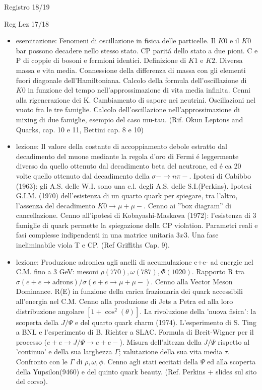 \begin{frame}{Registro 18/19}
\begin{frame}[allowframebreaks]{Reg Lez 17/18}
\begin{itemize}
\item esercitazione: Fenomeni di oscillazione in fisica delle particelle. Il $K0$ e il $K0$bar possono decadere nello stesso stato. CP parit\'a dello stato a due pioni. C e P di coppie di bosoni e fermioni identici. Definizione di $K1$ e $K2$. Diversa massa e vita media. Connessione della differenza di massa con gli elementi fuori diagonale dell'Hamiltoniana. Calcolo della formula dell'oscillazione di $K0$ in funzione del tempo nell'approssimazione di vita media infinita. Cenni alla rigenerazione dei K. Cambiamento di sapore nei neutrini. Oscillazioni nel vuoto fra le tre famiglie. Calcolo dell'oscillazione nell'approssimazione di mixing di due famiglie, esempio del caso mu-tau. (Rif. Okun Leptons and Quarks, cap. 10 e 11, Bettini cap. 8 e 10)

\item lezione: Il valore della costante di accoppiamento debole estratto dal decadimento del muone mediante la regola d'oro di Fermi \'e leggermente diverso da quello ottenuto dal decadimento beta del neutrone, ed \'e ca 20 volte quello ottenuto dal decadimento della $\sigma-\to n\pi-$. Ipotesi di Cabibbo (1963): gli A.S. delle W.I. sono una c.l. degli A.S. delle S.I.(Perkins). Ipotesi G.I.M. (1970) dell'esistenza di un quarto quark per spiegare, tra l'altro, l'assenza del decadimento $K0\to\mu+\mu-$. Cenno ai ''box diagram'' di cancellazione. Cenno all'ipotesi di Kobayashi-Maskawa (1972): l'esistenza di 3 famiglie di quark permette la spiegazione della CP violation. Parametri reali e fasi complesse indipendenti in una matrice unitaria $3x3$. Una fase ineliminabile viola T e CP. (Ref Griffiths Cap. 9).

\item  lezione: Produzione adronica agli anelli di accumulazione e+e- ad energie nel C.M. fino a 3 GeV: mesoni $\rho(770),\omega(787),\Phi(1020)$. Rapporto R tra $\sigma(e+e\to\text{adrons})/\sigma(e+e\to\mu+\mu-)$. Cenno alla Vector Meson Dominance. R(E) in funzione della carica frazionaria dei quark accessibili all'energia nel C.M. Cenno alla produzione di Jets a Petra ed alla loro distribuzione angolare $[1+\cos^2(\theta)]$. La rivoluzione della 'nuova fisica': la scoperta della $J/\Psi$ e del quarto quark charm (1974). L'esperimento di S. Ting a BNL e l'esperimento di B. Richter a SLAC. Formula di Breit-Wigner per il processo ($e+e\to J/\Psi\to e+e-$). Misura dell'altezza della $J/\Psi$ rispetto al 'continuo' e della sua larghezza $\Gamma$; valutazione della sua vita media $\tau$. Confronto con le $\Gamma$ di $\rho,\omega,\phi$. Cenno agli stati eccitati della $\Psi$ ed alla scoperta della Yupsilon(9460) e del quinto quark beauty. (Ref. Perkins + slides sul sito del corso).


\end{itemize}
\end{frame}
\end{frame}
